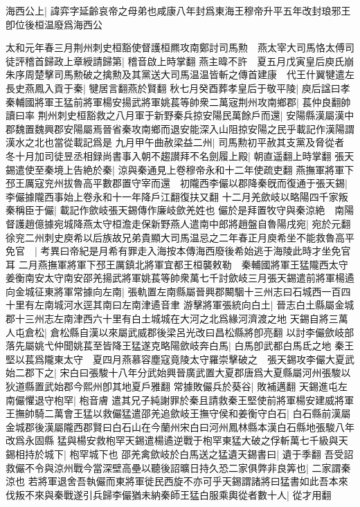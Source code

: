 海西公上|{
	諱弈字延齡哀帝之母弟也咸康八年封爲東海王穆帝升平五年改封琅邪王卽位後桓温廢爲海西公}


太和元年春三月荆州刺史桓豁使督護桓羆攻南鄭討司馬勲　燕太宰大司馬恪太傅司徒評稽首歸政上章綬請歸第|{
	稽音啟上時掌翻}
燕主暐不許　夏五月戊寅皇后庾氏崩　朱序周楚擊司馬勲破之擒勲及其黨送大司馬温温皆斬之傳首建康　代王什翼犍遣左長史燕鳳入貢于秦|{
	犍居言翻燕於賢翻}
秋七月癸酉葬孝皇后于敬平陵|{
	庾后諡曰孝}
秦輔國將軍王猛前將軍楊安揚武將軍姚萇等帥衆二萬宼荆州攻南鄉郡|{
	萇仲良翻帥讀曰率}
荆州刺史桓豁救之八月軍于新野秦兵掠安陽民萬餘戶而還|{
	安陽縣漢屬漢中郡魏置魏興郡安陽屬焉晉省秦攻南鄉而退安能深入山阻掠安陽之民乎載記作漢陽謂漢水之北也當從載記爲是}
九月甲午曲赦梁益二州|{
	司馬勲初平赦其支黨及脅從者}
冬十月加司徒昱丞相録尚書事入朝不趨讃拜不名劍履上殿|{
	朝直遥翻上時掌翻}
張天錫遣使至秦境上告絶於秦|{
	涼與秦通見上卷穆帝永和十二年使疏吏翻}
燕撫軍將軍下邳王厲寇兖州拔魯高平數郡置守宰而還　初隴西李儼以郡降秦旣而復通于張天錫|{
	李儼據隴西事始上卷永和十一年降戶江翻復扶又翻}
十二月羌歛岐以略陽四千家叛秦稱臣于儼|{
	載記作歛岐張天錫傳作廉岐歛羌姓也}
儼於是拜置牧守與秦涼絶　南陽督護趙億據宛城降燕太守桓澹走保新野燕人遣南中郎將趙盤自魯陽戌宛|{
	宛於元翻}
徐兖二州刺史庾希以后族故兄弟貴顯大司馬温忌之二年春正月庾希坐不能救魯高平免官　|{
	考異曰帝紀是月希有罪走入海按本傳海西廢後希始逃于海陵此時才坐免官耳}
二月燕撫軍將軍下邳王厲鎮北將軍宜都王桓襲敕勒　秦輔國將軍王猛隴西太守姜衡南安太守南安邵羌揚武將軍姚萇等帥衆萬七千討歛岐三月張天錫遣前將軍楊遹向金城征東將軍常據向左南|{
	張軌置左南縣屬晉興郡闞駰十三州志曰石城西一百四十里有左南城河水逕其南曰左南津遹音聿}
游擊將軍張統向白土|{
	晉志白土縣屬金城郡十三州志左南津西六十里有白土城城在大河之北爲緣河濟渡之地}
天錫自將三萬人屯倉松|{
	倉松縣自漢以來屬武威郡後梁呂光改曰昌松縣將卽亮翻}
以討李儼歛岐部落先屬姚弋仲聞姚萇至皆降王猛遂克略陽歛岐奔白馬|{
	白馬卽武都白馬氐之地}
秦王堅以萇爲隴東太守　夏四月燕慕容塵寇竟陵太守羅崇擊破之　張天錫攻李儼大夏武始二郡下之|{
	宋白曰張駿十八年分武始興晉廣武置大夏郡唐爲大夏縣屬河州張駿以狄道縣置武始郡今熙州卽其地夏戶雅翻}
常據敗儼兵於葵谷|{
	敗補邁翻}
天錫進屯左南儼懼退守枹罕|{
	枹音膚}
遣其兄子純謝罪於秦且請救秦王堅使前將軍楊安建威將軍王撫帥騎二萬會王猛以救儼猛遣邵羌追歛岐王撫守侯和姜衡守白石|{
	白石縣前漢屬金城郡後漢屬隴西郡賢曰白石山在今蘭州宋白曰河州鳳林縣本漢白石縣地張駿八年改爲永固縣}
猛與楊安救枹罕天錫遣楊遹逆戰于枹罕東猛大破之俘斬萬七千級與天錫相持於城下|{
	枹罕城下也}
邵羌禽歛岐於白馬送之猛遺天錫書曰|{
	遺于季翻}
吾受詔救儼不令與涼州戰今當深壁高壘以聽後詔曠日持久恐二家俱弊非良筭也|{
	二家謂秦涼也}
若將軍退舍吾執儼而東將軍徙民西旋不亦可乎天錫謂諸將曰猛書如此吾本來伐叛不來與秦戰遂引兵歸李儼猶未納秦師王猛白服乘輿從者數十人|{
	從才用翻}
